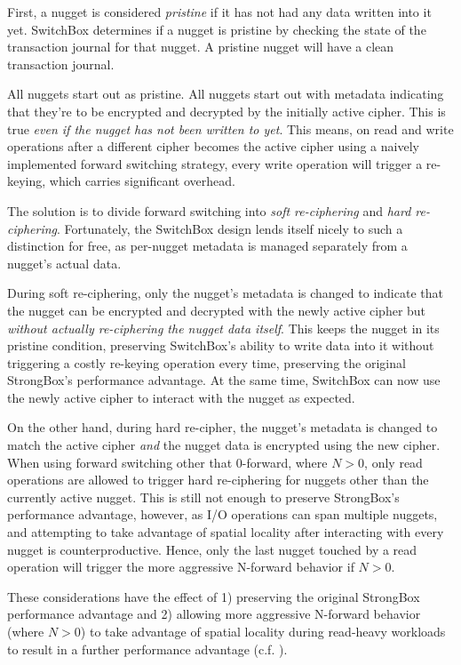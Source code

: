 First, a nugget is considered \emph{pristine} if it has not had any data written
into it yet. SwitchBox determines if a nugget is pristine by checking the state
of the transaction journal for that nugget. A pristine nugget will have a clean
transaction journal.

All nuggets start out as pristine. All nuggets start out with metadata
indicating that they're to be encrypted and decrypted by the initially active
cipher. This is true \emph{even if the nugget has not been written to yet}. This
means, on read and write operations after a different cipher becomes the
active cipher using a naively implemented forward switching strategy, every
write operation will trigger a re-keying, which carries significant overhead.

The solution is to divide forward switching into \emph{soft re-ciphering} and
\emph{hard re-ciphering}. Fortunately, the SwitchBox design lends itself nicely
to such a distinction for free, as per-nugget metadata is managed separately
from a nugget's actual data.

During soft re-ciphering, only the nugget's metadata is changed to indicate that
the nugget can be encrypted and decrypted with the newly active cipher but
\emph{without actually re-ciphering the nugget data itself}. This keeps the
nugget in its pristine condition, preserving SwitchBox's ability to write data
into it without triggering a costly re-keying operation every time, preserving
the original StrongBox's performance advantage. At the same time, SwitchBox can
now use the newly active cipher to interact with the nugget as expected.

On the other hand, during hard re-cipher, the nugget's metadata is changed to
match the active cipher \emph{and} the nugget data is encrypted using the new
cipher. When using forward switching other that 0-forward,  where
$N > 0$, only read operations are allowed to trigger hard re-ciphering for
nuggets other than the currently active nugget. This is still not enough to
preserve StrongBox's performance advantage, however, as I/O operations can span
multiple nuggets, and attempting to take advantage of spatial locality after
interacting with every nugget is counterproductive. Hence, only the last nugget
touched by a read operation will trigger the more aggressive N-forward behavior
if $N > 0$.

These considerations have the effect of 1) preserving the original StrongBox
performance advantage and 2) allowing more aggressive N-forward behavior (where
$N > 0$) to take advantage of spatial locality during read-heavy workloads to
result in a further performance advantage (c.f. ).

